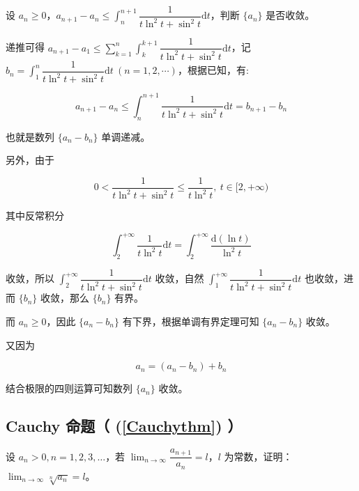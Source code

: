 \begin{exercise}

设 $\displaystyle a_n \ge 0$，$\displaystyle a_{n+1} - a_n \le \int_n^{n+1} \dfrac{1}{t \ln^2 t + \sin^2 t} \mathrm{d}t$，判断 $\displaystyle \lbrace a_n \rbrace$ 是否收敛。

\end{exercise}

递推可得 $\displaystyle a_{n+1} - a_1 \le \sum_{k=1}^{n}\int_k^{k+1} \dfrac{1}{t \ln^2 t + \sin^2 t} \mathrm{d}t$，记 $\displaystyle b_n = \int_1^n \dfrac{1}{t \ln^2 t + \sin^2 t} \mathrm{d}t \ (n = 1, 2, \cdots)$，根据已知，有:

$$
\displaystyle a_{n+1} - a_n \le \int_n^{n+1} \dfrac{1}{t \ln^2 t + \sin^2 t} \mathrm{d}t = b_{n+1} - b_n
$$

也就是数列 $\displaystyle \lbrace a_n - b_n \rbrace$ 单调递减。

另外，由于

$$
\displaystyle 0 < \dfrac{1}{t \ln^2 t + \sin^2 t} \le \dfrac{1}{t \ln^2 t}, \ t \in [2, +\infty)
$$

其中反常积分

$$
\displaystyle \int_2^{+\infty} \dfrac{1}{t \ln^2 t} \mathrm{d}t = \int_2^{+\infty} \dfrac{\mathrm{d}(\ln t)}{\ln^2 t}
$$

收敛，所以 $\displaystyle \int_2^{+\infty} \dfrac{1}{t \ln^2 t + \sin^2 t} \mathrm{d}t$ 收敛，自然 $\displaystyle \int_1^{+\infty} \dfrac{1}{t \ln^2 t + \sin^2 t} \mathrm{d}t$ 也收敛，进而 $\displaystyle \lbrace b_n \rbrace$ 收敛，那么 $\displaystyle \lbrace b_n \rbrace$ 有界。

而 $\displaystyle a_n \ge 0$，因此 $\displaystyle \lbrace a_n - b_n \rbrace$ 有下界，根据单调有界定理可知 $\displaystyle \lbrace a_n - b_n \rbrace$ 收敛。

又因为

$$
\displaystyle a_n = (a_n - b_n) + b_n
$$

结合极限的四则运算可知数列 $\displaystyle \lbrace a_n \rbrace$ 收敛。

\subsection{Cauchy 命题（ (\ref{Cauchythm}) ）}

\begin{proposition}

\label{Cauchythm2}设 $a_n > 0, n = 1, 2, 3, \dots$，若 $\displaystyle \lim_{n \to \infty} \dfrac{a_{n+1}}{a_n} = l$，$l$ 为常数，证明：$\displaystyle \lim_{n \to \infty} \sqrt[n]{a_n} = l$。

\end{proposition}

